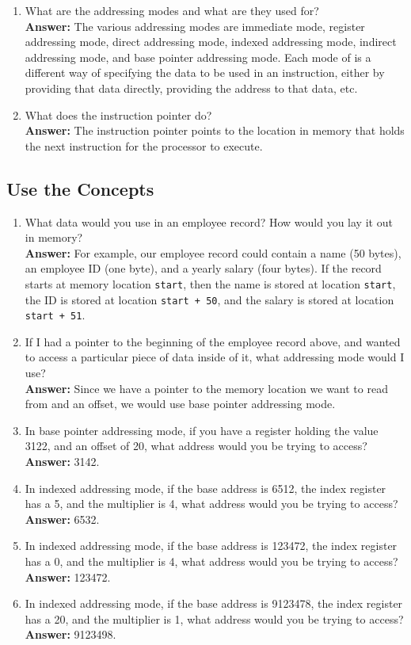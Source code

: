 \documentclass[12pt]{article}
\begin{document}
\begin{enumerate}
    \item What are the addressing modes and what are they used for? \\
        \textbf{Answer:} The various addressing modes are immediate mode, register addressing mode, direct addressing mode, indexed addressing mode, indirect addressing mode, and base pointer addressing mode. Each mode of is a different way of specifying the data to be used in an instruction, either by providing that data directly, providing the address to that data, etc.
    \item What does the instruction pointer do? \\
        \textbf{Answer:} The instruction pointer points to the location in memory that holds the next instruction for the processor to execute.
\end{enumerate}

\subsection*{Use the Concepts}
\begin{enumerate}
    \item What data would you use in an employee record? How would you lay it out in memory? \\
	    \textbf{Answer:} For example, our employee record could contain a name (50 bytes), an employee ID (one byte), and a yearly salary (four bytes). If the record starts at memory location \texttt{start}, then the name is stored at location \texttt{start}, the ID is stored at location \texttt{start + 50}, and the salary is stored at location \texttt{start + 51}.
    \item If I had a pointer to the beginning of the employee record above, and wanted to access a particular piece of data inside of it, what addressing mode would I use? \\
        \textbf{Answer:} Since we have a pointer to the memory location we want to read from and an offset, we would use base pointer addressing mode.
    \item In base pointer addressing mode, if you have a register holding the value 3122, and an offset of 20, what address would you be trying to access? \\
        \textbf{Answer:} 3142.
    \item In indexed addressing mode, if the base address is 6512, the index register has a 5, and the multiplier is 4, what address would you be trying to access? \\
        \textbf{Answer:} 6532.
    \item In indexed addressing mode, if the base address is 123472, the index register has a 0, and the multiplier is 4, what address would you be trying to access? \\
        \textbf{Answer:} 123472.
    \item In indexed addressing mode, if the base address is 9123478, the index register has a 20, and the multiplier is 1, what address would you be trying to access? \\
        \textbf{Answer:} 9123498.
\end{enumerate}
\end{document}

